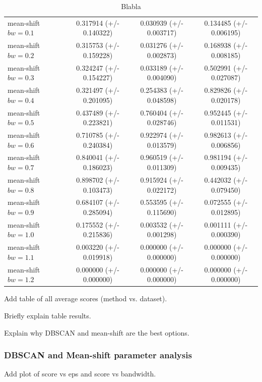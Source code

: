 \documentclass[conference]{IEEEtran}
\begin{document}
\begin{table}[t]
\begin{tabular}{ | l*{4}{c} | }
    \hline
    mean-shift $bw =0.1$ & \vline & 0.317914 (+/- 0.140322) & 0.030939 (+/- 0.003717) & 0.134485 (+/- 0.006195) \\
    mean-shift $bw =0.2$ & \vline & 0.315753 (+/- 0.159228) & 0.031276 (+/- 0.002873) & 0.168938 (+/- 0.008185) \\
    mean-shift $bw =0.3$ & \vline & 0.324247 (+/- 0.154227) & 0.033189 (+/- 0.004090) & 0.502991 (+/- 0.027087) \\
    mean-shift $bw =0.4$ & \vline & 0.321497 (+/- 0.201095) & 0.254383 (+/- 0.048598) & 0.829826 (+/- 0.020178) \\
    mean-shift $bw =0.5$ & \vline & 0.437489 (+/- 0.223821) & 0.760404 (+/- 0.028746) & 0.952445 (+/- 0.011531) \\
    mean-shift $bw =0.6$ & \vline & 0.710785 (+/- 0.240384) & 0.922974 (+/- 0.013579) & 0.982613 (+/- 0.006856) \\
    mean-shift $bw =0.7$ & \vline & 0.840041 (+/- 0.186023) & 0.960519 (+/- 0.011309) & 0.981194 (+/- 0.009435) \\
    mean-shift $bw =0.8$ & \vline & 0.898702 (+/- 0.103473) & 0.915924 (+/- 0.022172) & 0.442032 (+/- 0.079450) \\
    mean-shift $bw =0.9$ & \vline & 0.684107 (+/- 0.285094) & 0.553595 (+/- 0.115690) & 0.072555 (+/- 0.012895) \\
    mean-shift $bw =1.0$ & \vline & 0.175552 (+/- 0.215836) & 0.003532 (+/- 0.001298) & 0.001111 (+/- 0.000390) \\
    mean-shift $bw =1.1$ & \vline & 0.003220 (+/- 0.019918) & 0.000000 (+/- 0.000000) & 0.000000 (+/- 0.000000) \\
    mean-shift $bw =1.2$ & \vline & 0.000000 (+/- 0.000000) & 0.000000 (+/- 0.000000) & 0.000000 (+/- 0.000000) \\
    \hline
  \end{tabular}
  \caption{Blabla}
  \label{tab:1}
\end{table}

Add table of all average scores (method vs. dataset).

Briefly explain table results.

Explain why DBSCAN and mean-shift are the best options.

\subsubsection{DBSCAN and Mean-shift parameter analysis}

Add plot of score vs eps and score vs bandwidth.
\end{document}
